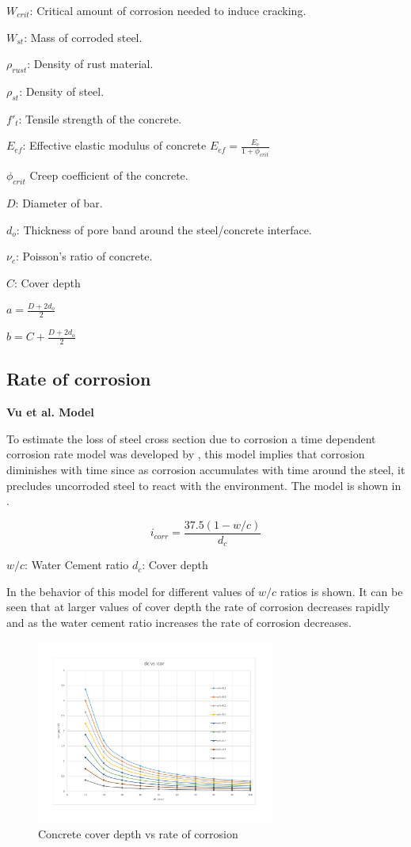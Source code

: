$W_{crit}$: Critical amount of corrosion needed to induce cracking.

$W_{st}$: Mass of corroded steel.

$\rho_{rust}$: Density of rust material.

$\rho_{st}$: Density of steel.

$f'_t$: Tensile strength of the concrete. 

$E_{ef}$: Effective elastic modulus of concrete $E_{ef}=\frac{E_c}{1+\phi_{crit}}$ 

$\phi_{crit}$ Creep coefficient of the concrete.

$D$: Diameter of bar.

$d_o$: Thickness of pore band around the steel/concrete interface.

$\nu_c$: Poisson's ratio of concrete.

$C$: Cover depth

$a=\frac{D+2d_o}{2}$

$b=C+\frac{D+2d_o}{2}$

\subsection{Rate of corrosion}

\textbf{Vu et al. Model }

To estimate the loss of steel cross section due to corrosion a time dependent corrosion rate model was developed by \cite{Vu2000}, this model implies that corrosion diminishes with time since as corrosion accumulates with time around the steel, it precludes uncorroded steel to react with the environment. The model is shown in .

\begin{equation}
  i_{corr}=\frac{37.5(1-w/c)}{d_c}
  \label{eq.five}
\end{equation} 

$w/c$: Water Cement ratio
$d_c$: Cover depth

In  the behavior of this model for different values of $w/c$ ratios is shown. It can be seen that at larger values of cover depth the rate of corrosion decreases rapidly and as the water cement ratio increases the rate of corrosion decreases.
%
\begin{figure}[htbp]
\centering
\includegraphics[width=0.7\textwidth]{Chapter-1/figs/dcvsicor}
\caption{Concrete cover depth vs rate of corrosion}
\label{fig:hist1}
\end{figure}

